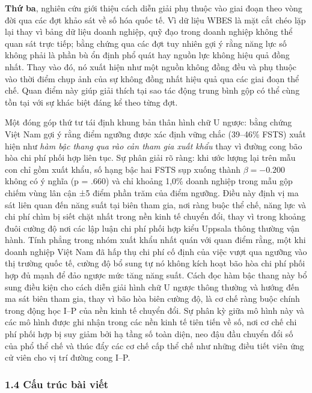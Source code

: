 \documentclass[12pt,a4paper]{article}
\begin{document}
\textbf{Thứ ba}, nghiên cứu giới thiệu cách diễn giải phụ thuộc vào giai
đoạn theo vòng đời qua các đợt khảo sát về số hóa quốc tế. Vì dữ liệu
WBES là mặt cắt chéo lặp lại thay vì bảng dữ liệu doanh nghiệp, quỹ đạo
trong doanh nghiệp không thể quan sát trực tiếp; bằng chứng qua các đợt
tuy nhiên gợi ý rằng năng lực số không phải là phần bù ổn định phổ quát
hay nguồn lực không hiệu quả đồng nhất. Thay vào đó, nó xuất hiện như
một nguồn không đồng đều và phụ thuộc vào thời điểm chụp ảnh của sự
không đồng nhất hiệu quả qua các giai đoạn thể chế. Quan điểm này giúp
giải thích tại sao tác động trung bình gộp có thể cùng tồn tại với sự
khác biệt đáng kể theo từng đợt.

Một đóng góp thứ tư tái định khung bản thân hình chữ U ngược: bằng chứng
Việt Nam gợi ý rằng điểm ngưỡng được xác định vững chắc (39--46\% FSTS)
xuất hiện như \emph{hàm bậc thang qua rào cản tham gia xuất khẩu} thay
vì đường cong bão hòa chi phí phối hợp liên tục. Sự phân giải rõ ràng:
khi ước lượng lại trên mẫu con chỉ gồm xuất khẩu, số hạng bậc hai FSTS
sụp xuống thành \(\beta = −0.200\) không có ý nghĩa (p = .660) và chỉ
khoảng 1,0\% doanh nghiệp trong mẫu gộp chiếm vùng lân cận ±5 điểm phần
trăm của điểm ngưỡng. Điều này định vị ma sát liên quan đến năng suất
tại biên tham gia, nơi ràng buộc thể chế, năng lực và chi phí chìm bị
siết chặt nhất trong nền kinh tế chuyển đổi, thay vì trong khoảng đuôi
cường độ nơi các lập luận chi phí phối hợp kiểu Uppsala thông thường vận
hành. Tính phẳng trong nhóm xuất khẩu nhất quán với quan điểm rằng, một
khi doanh nghiệp Việt Nam đã hấp thụ chi phí cố định của việc vượt qua
ngưỡng vào thị trường quốc tế, cường độ bổ sung tự nó không kích hoạt
bão hòa chi phí phối hợp đủ mạnh để đảo ngược mức tăng năng suất. Cách
đọc hàm bậc thang này bổ sung điều kiện cho cách diễn giải hình chữ U
ngược thông thường và hướng đến ma sát biên tham gia, thay vì bão hòa
biên cường độ, là cơ chế ràng buộc chính trong động học I--P của nền
kinh tế chuyển đổi. Sự phân kỳ giữa mô hình này và các mô hình được ghi
nhận trong các nền kinh tế tiên tiến về số, nơi cơ chế chi phí phối hợp
bị suy giảm bởi hạ tầng số toàn diện, neo đậu đầu chuyển đổi số của phổ
thể chế và thúc đẩy các cơ chế cấp thể chế như những điều tiết viên ứng
cử viên cho vị trí đường cong I--P.

\hypertarget{14-cux1ea5u-truxfac-buxe0i-viux1ebft}{%
\subsubsection{1.4 Cấu trúc bài
viết}\label{14-cux1ea5u-truxfac-buxe0i-viux1ebft}}
\end{document}
